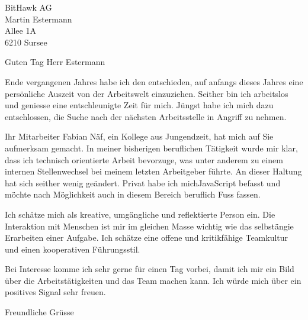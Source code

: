 \documentclass[
	pagenumber=false, 
	parskip=half, 
	fromalign=right, 
	foldmarks=true, 
	addrfield=true 
	]{scrlttr2}
\date{\today}
\begin{document}
\begin{letter}{BitHawk AG \\ Martin Estermann \\ Allee 1A \\ 6210 Sursee} 

\opening{Guten Tag Herr Estermann}

Ende vergangenen Jahres habe ich den entschieden, auf anfangs dieses Jahres eine persönliche Auszeit von der Arbeitswelt einzuziehen. Seither bin ich arbeitslos und geniesse eine entschleunigte Zeit für mich. Jüngst habe ich mich dazu entschlossen, die Suche nach der nächsten Arbeitsstelle in Angriff zu nehmen.

Ihr Mitarbeiter Fabian Näf, ein Kollege aus Jungendzeit, hat mich auf Sie aufmerksam gemacht. In meiner bisherigen beruflichen Tätigkeit wurde mir klar, dass ich technisch orientierte Arbeit bevorzuge, was unter anderem zu einem internen Stellenwechsel bei meinem letzten Arbeitgeber führte. An dieser Haltung hat sich seither wenig geändert. Privat habe ich michJavaScript befasst und möchte nach Möglichkeit auch in diesem Bereich beruflich Fuss fassen.

Ich schätze mich als kreative, umgängliche und reflektierte Person ein. Die Interaktion mit Menschen ist mir im gleichen Masse wichtig wie das selbstängie Erarbeiten einer Aufgabe. Ich schätze eine offene und kritikfähige Teamkultur und einen kooperativen Führungsstil.

Bei Interesse komme ich sehr gerne für einen Tag vorbei, damit ich mir ein Bild über die Arbeitstätigkeiten und das Team machen kann. Ich würde mich über ein positives Signal sehr freuen. 

\closing{Freundliche Grüsse}


\end{letter}
\end{document}
